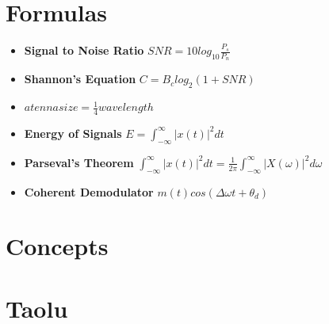 \documentclass{article}
\begin{document}
\Large
     \section{Formulas}
     \begin{itemize}
        \item \textbf{Signal to Noise Ratio} $SNR = 10log_{10}\frac{P_s}{P_n}$
        \item \textbf{Shannon's Equation} $C = B_clog_2(1+SNR)$
        \item $atenna size = \frac{1}{4}wavelength$
        \item \textbf{Energy of Signals} $E = \int_{-\infty} ^{\infty} |x(t)|^2dt$
        \item \textbf{Parseval's Theorem}  $\int_{-\infty} ^{\infty} |x(t)|^2dt = \frac{1}{2\pi}\int_{-\infty}^{\infty}|X(\omega)|^2d\omega$
        \item \textbf{Coherent Demodulator} $m(t)cos(\Delta \omega t + \theta_d)$
     \end{itemize}
     
     
     \section{Concepts}

     \section{Taolu}
\end{document}
